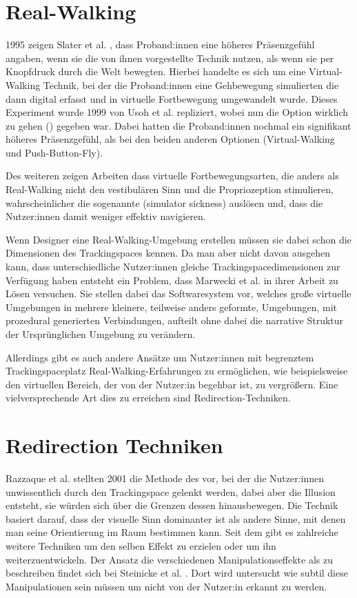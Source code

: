 \section{Real-Walking}
1995 zeigen Slater et al. \cite{taking-steps}, dass Proband:innen eine höheres Präsenzgefühl angaben, wenn sie die von ihnen vorgestellte Technik  nutzen, als wenn sie per Knopfdruck durch die Welt bewegten. Hierbei handelte es sich um eine Virtual-Walking Technik, bei der die Proband:innen eine Gehbewegung simulierten die dann digital erfasst und in virtuelle Fortbewegung umgewandelt wurde. Dieses Experiment wurde 1999 von Usoh et al. \cite{usoh-vergleich-1999} repliziert, wobei nun die Option wirklich zu gehen () gegeben war. Dabei hatten die Proband:innen nochmal ein signifikant höheres Präsenzgefühl, als bei den beiden anderen Optionen (Virtual-Walking und Push-Button-Fly).

Des weiteren zeigen Arbeiten dass virtuelle Fortbewegungsarten, die anders
als Real-Walking nicht den vestibulären Sinn und die Propriozeption stimulieren, wahrscheinlicher die sogenannte (simulator sickness) auslösen \cite{locomotion-path-integration} und, dass die Nutzer:innen damit weniger effektiv navigieren. \cite{benefits-real-walking}

Wenn Designer eine Real-Walking-Umgebung erstellen müssen sie dabei schon die Dimensionen des Trackingspaces kennen. Da man aber nicht davon ausgehen kann, dass unterschiedliche Nutzer:innen gleiche Trackingspacedimensionen zur Verfügung haben entsteht ein Problem, dass Marwecki et al. in ihrer Arbeit \cite{scenograph} zu Lösen versuchen. Sie stellen dabei das Softwaresystem  vor, welches große virtuelle Umgebungen in mehrere kleinere, teilweise anders geformte, Umgebungen, mit prozedural generierten Verbindungen, aufteilt ohne dabei die narrative Struktur der Ursprünglichen Umgebung zu verändern.

Allerdings gibt es auch andere Ansätze um Nutzer:innen mit begrenztem Trackingspaceplatz Real-Walking-Erfahrungen zu ermöglichen, wie beispielsweise den virtuellen Bereich, der von der Nutzer:in begehbar ist, zu vergrößern.
Eine vielversprechende Art dies zu erreichen sind Redirection-Techniken.

\section{Redirection Techniken}
Razzaque et al. \cite{rdw-razzaque} stellten 2001 die Methode des  vor, bei der die Nutzer:innen unwissentlich durch den Trackingspace gelenkt werden, dabei aber die Illusion entsteht, sie würden sich über die Grenzen dessen hinausbewegen. Die Technik basiert darauf, dass der visuelle Sinn dominanter ist als andere Sinne, mit denen man seine Orientierung im Raum bestimmen kann.
Seit dem gibt es zahlreiche weitere Techniken um den selben Effekt zu erzielen oder um ihn weiterzuentwickeln. Der Ansatz die verschiedenen Manipulationseffekte als  zu beschreiben findet sich bei Steinicke et al. \cite{detection-thresholds}. Dort wird untersucht wie subtil diese Manipulationen sein müssen um nicht von der Nutzer:in erkannt zu werden.

